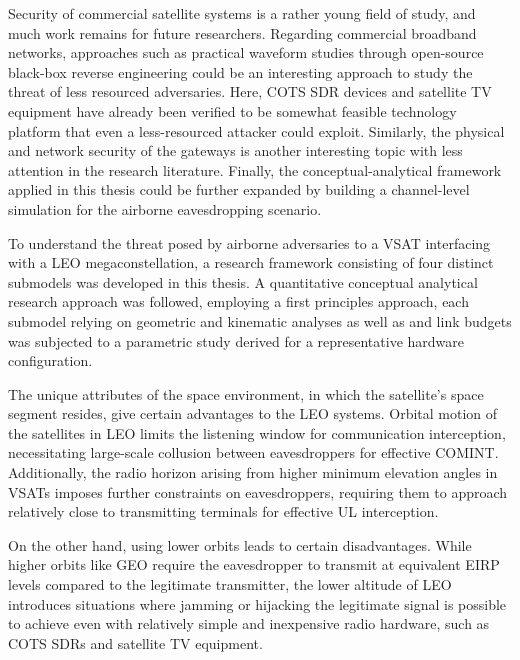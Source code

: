 \documentclass[english, 12pt, a4paper, elec, utf8, a-1b, online]{aaltothesis}
\begin{document}
Security of commercial satellite systems is a rather young field of study, and much work remains for future researchers.
Regarding commercial broadband networks, approaches such as practical waveform studies through open-source black-box reverse engineering could be an interesting approach to study the threat of less resourced adversaries.
Here, COTS SDR devices and satellite TV equipment have already been verified to be somewhat feasible technology platform that even a less-resourced attacker could exploit.
Similarly, the physical and network security of the gateways is another interesting topic with less attention in the research literature.
Finally, the conceptual-analytical framework applied in this thesis could be further expanded by building a channel-level simulation for the airborne eavesdropping scenario.

To understand the threat posed by airborne adversaries to a VSAT interfacing with a LEO megaconstellation, a research framework consisting of four distinct submodels was developed in this thesis. A quantitative conceptual analytical research approach was followed, employing a first principles approach, each submodel relying on geometric and kinematic analyses as well as and link budgets was subjected to a parametric study derived for a representative hardware configuration.

The unique attributes of the space environment, in which the satellite's space segment resides, give certain advantages to the LEO systems.
Orbital motion of the satellites in LEO limits the listening window for communication interception, necessitating large-scale collusion between eavesdroppers for effective COMINT.
Additionally, the radio horizon arising from higher minimum elevation angles in VSATs imposes further constraints on eavesdroppers, requiring them to approach relatively close to transmitting terminals for effective UL interception.

On the other hand, using lower orbits leads to certain disadvantages.
While higher orbits like GEO require the eavesdropper to transmit at equivalent EIRP levels compared to the legitimate transmitter, the lower altitude of LEO introduces situations where jamming or hijacking the legitimate signal is possible to achieve even with relatively simple and inexpensive radio hardware, such as COTS SDRs and satellite TV equipment.
\end{document}
